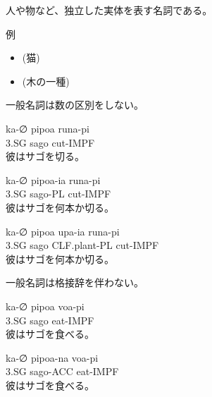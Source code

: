 人や物など、独立した実体を表す名詞である。

例
\begin{itemize}
\item {} (猫)
\item {} (木の一種)
\end{itemize}

一般名詞は数の区別をしない。
\begin{exe}
    \ex \gll ka-∅ pipoa runa-pi \\
        3.SG sago cut-IMPF \\
        \glt 彼はサゴを切る。
\end{exe}
\begin{exe}
    \ex \gll *ka-∅ pipoa-ia runa-pi \\
        3.SG sago-PL cut-IMPF \\
        \glt 彼はサゴを何本か切る。
\end{exe}
\begin{exe}
    \ex \gll ka-∅ pipoa upa-ia runa-pi \\
        3.SG sago CLF.plant-PL cut-IMPF \\
        \glt 彼はサゴを何本か切る。
\end{exe}

一般名詞は格接辞を伴わない。
\begin{exe}
    \ex \gll ka-∅ pipoa voa-pi \\
        3.SG sago eat-IMPF \\
        \glt 彼はサゴを食べる。
\end{exe}
\begin{exe}
    \ex \gll *ka-∅ pipoa-na voa-pi \\
        3.SG sago-ACC eat-IMPF \\
        \glt 彼はサゴを食べる。
\end{exe}
